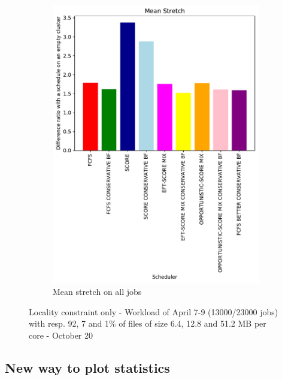 \documentclass[a4paper]{article}
\begin{document}
\begin{figure}[H]
\begin{subfigure}[b]{0.4\linewidth}\centering\includegraphics[width=0.9\linewidth]{MBSS/plot/Results_FCFS_Score_Backfill_2022-04-07->2022-04-09_V9271_Mean_Stretch_450_128_32_256_4_1024.pdf}\caption{Mean stretch on all jobs}\end{subfigure}
\caption{Locality constraint only - Workload of April 7-9 (13000/23000 jobs) with resp. 92, 7 and 1\% of files of size 6.4, 12.8 and 51.2 MB per core - October 20}\end{figure}

\subsection{New way to plot statistics}
\end{document}
